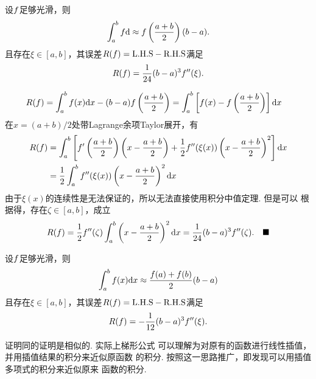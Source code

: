   \begin{pos}[中矩形公式]
    \label{pos: 中矩形公式}
    设$\mathnormal{f}$足够光滑，则
    \[
      \int_a^b\mathnormal{f}\mathrm{d} \approx \mathnormal{f}\left(\frac{a+b}{2}\right)(b-a).
    \]
    且存在$\xi\in[a, b]$，其误差$R(\mathnormal{f})=\text{L.H.S}-\text{R.H.S}$满足
    \[
      R(\mathnormal{f}) = \frac{1}{24}(b-a)^3\mathnormal{f}^{\prime\prime}(\xi).
    \]
  \end{pos}
  \proof
    \[\begin{split}
      R(\mathnormal{f}) &= \int_a^b\mathnormal{f}(x)\mathrm{d} x - (b-a)\mathnormal{f}\left( \frac{a+b}{2} \right) = \int_a^b \left[
        \mathnormal{f}(x) - \mathnormal{f}\left(\frac{a+b}{2}\right)
      \right]\mathrm{d} x
    \end{split}\]
    在$x = (a+b)/2$处带Lagrange余项Taylor展开，有
    \[\begin{split}
      R(\mathnormal{f}) &= \int_a^b\left[ \mathnormal{f}^\prime\left(\frac{a+b}{2}\right)\left(x - \frac{a+b}{2}\right)
       + \frac{1}{2}\mathnormal{f}^{\prime\prime}(\xi(x))\left(x - \frac{a+b}{2}\right)^2\right]\mathrm{d} x \\
       &= \frac{1}{2}\int_a^b\mathnormal{f}^{\prime\prime}(\xi(x))\left(x - \frac{a+b}{2}\right)^2\mathrm{d} x
    \end{split}\]
    由于$\xi(x)$的连续性是无法保证的，所以无法直接使用积分中值定理. 但是可以
    根据得，存在$\zeta\in[a, b]$，成立
    \[
      R(\mathnormal{f}) = \frac{1}{2}\mathnormal{f}^{\prime\prime}(\zeta)\int_a^b\left( x-\frac{a+b}{2} \right)^2\mathrm{d} x
      = \frac{1}{24}(b-a)^3\mathnormal{f}^{\prime\prime}(\zeta).\quad\blacksquare
    \]

  \begin{pos}[梯形公式]
    设$\mathnormal{f}$足够光滑，则
    \[
      \int_a^b\mathnormal{f}(x)\mathrm{d} x \approx \frac{\mathnormal{f}(a)+\mathnormal{f}(b)}{2}(b-a)
    \]
    且存在$\xi\in[a, b]$，其误差$R(\mathnormal{f})=\text{L.H.S}-\text{R.H.S}$满足
    \[
      R(\mathnormal{f}) = -\frac{1}{12}(b-a)^3\mathnormal{f}^{\prime\prime}(\xi).
    \]
  \end{pos}
  \remark
    证明同的证明是相似的. 实际上梯形公式
    可以理解为对原有的函数进行线性插值，并用插值结果的积分来近似原函数
    的积分. 按照这一思路推广，即发现可以用插值多项式的积分来近似原来
    函数的积分.

